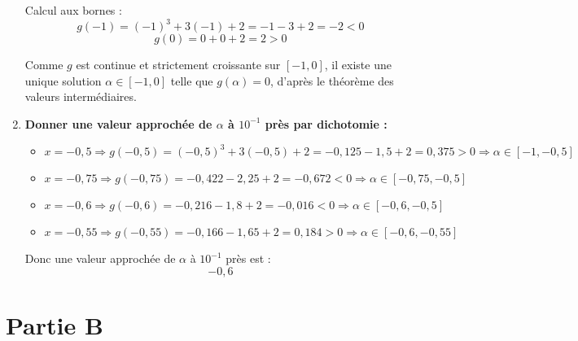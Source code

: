 \documentclass[a4paper,12pt]{article}
\begin{document}
\begin{enumerate}
    Calcul aux bornes :
    \[
    g(-1) = (-1)^3 + 3(-1) + 2 = -1 - 3 + 2 = -2 < 0
    \]
    \[
    g(0) = 0 + 0 + 2 = 2 > 0
    \]

    Comme \( g \) est continue et strictement croissante sur \( [-1, 0] \), il existe une unique solution \( \alpha \in [-1, 0] \) telle que \( g(\alpha) = 0 \), d’après le théorème des valeurs intermédiaires.

    \item \textbf{Donner une valeur approchée de \( \alpha \) à \( 10^{-1} \) près par dichotomie :}

    \begin{itemize}
        \item \( x = -0{,}5 \Rightarrow g(-0{,}5) = (-0{,}5)^3 + 3(-0{,}5) + 2 = -0{,}125 - 1{,}5 + 2 = 0{,}375 > 0 \Rightarrow \alpha \in [-1, -0{,}5] \)
        \item \( x = -0{,}75 \Rightarrow g(-0{,}75) = -0{,}422 - 2{,}25 + 2 = -0{,}672 < 0 \Rightarrow \alpha \in [-0{,}75, -0{,}5] \)
        \item \( x = -0{,}6 \Rightarrow g(-0{,}6) = -0{,}216 - 1{,}8 + 2 = -0{,}016 < 0 \Rightarrow \alpha \in [-0{,}6, -0{,}5] \)
        \item \( x = -0{,}55 \Rightarrow g(-0{,}55) = -0{,}166 - 1{,}65 + 2 = 0{,}184 > 0 \Rightarrow \alpha \in [-0{,}6, -0{,}55] \)
    \end{itemize}

    Donc une valeur approchée de \( \alpha \) à \( 10^{-1} \) près est :
    \[
    \boxed{-0{,}6}
    \]

\end{enumerate}
\section*{Partie B}
\end{document}
